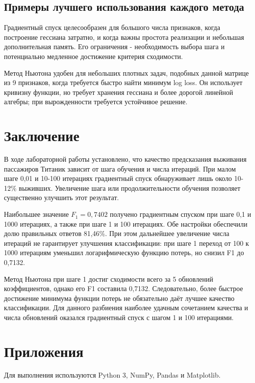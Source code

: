 \documentclass[a4paper,12pt]{article}
\begin{document}
\subsection{Примеры лучшего использования каждого метода}

Градиентный спуск целесообразен для большого числа признаков, когда построение гессиана затратно, и когда важны простота реализации и небольшая дополнительная память. Его ограничения - необходимость выбора шага и потенциально медленное достижение критерия сходимости.

Метод Ньютона удобен для небольших плотных задач, подобных данной матрице из 9 признаков, когда требуется быстро найти минимум log loss. Он использует кривизну функции, но требует хранения гессиана и более дорогой линейной алгебры; при вырожденности требуется устойчивое решение.

\section{Заключение}
В ходе лабораторной работы установлено, что качество предсказания выживания пассажиров Титаник зависит от шага обучения и числа итераций. При малом шаге 0,01 и 10-100 итерациях градиентный спуск обнаруживает лишь около 10-12\% выживших. Увеличение шага или продолжительности обучения позволяет существенно улучшить этот результат.

Наибольшее значение $F_1=0,7402$ получено градиентным спуском при шаге 0,1 и 1000 итерациях, а также при шаге 1 и 100 итерациях. Обе настройки обеспечили долю правильных ответов 81,46\%. При этом дальнейшее увеличение числа итераций не гарантирует улучшения классификации: при шаге 1 переход от 100 к 1000 итерациям уменьшил логарифмическую функцию потерь, но снизил F1 до 0,7132.

Метод Ньютона при шаге 1 достиг сходимости всего за 5 обновлений коэффициентов, однако его F1 составила 0,7132. Следовательно, более быстрое достижение минимума функции потерь не обязательно даёт лучшее качество классификации. Для данного разбиения наиболее удачным сочетанием качества и числа обновлений оказался градиентный спуск с шагом 1 и 100 итерациями.

\clearpage

\section{Приложения}

Для выполнения используются Python 3, NumPy, Pandas и Matplotlib.
\end{document}
